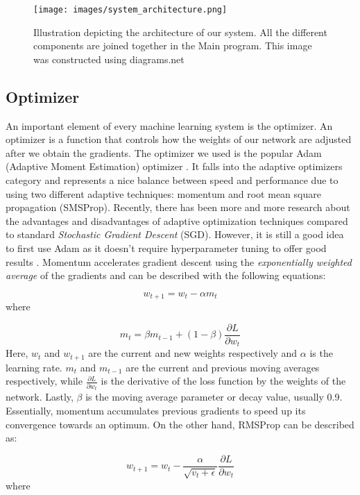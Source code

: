 \documentclass[times, utf8, diplomski, english]{fer_eng}
\begin{document}
\begin{figure}[h]
	\centering
	\texttt{[image: images/system\_architecture.png]}
	\caption[Architecture]{Illustration depicting the architecture of our system. All the different components are joined together in the Main program. This image was constructed using diagrams.net\footnotemark{}}
	\label{fig:architecture}
\end{figure}

\subsection{Optimizer}
\label{subsec:optimizer}

An important element of every machine learning system is the optimizer. An optimizer is a function that controls how the weights of our network are adjusted after we obtain the gradients. The optimizer we used is the popular Adam (Adaptive Moment Estimation) optimizer \cite{adam}. It falls into the adaptive optimizers category and represents a nice balance between speed and performance due to using two different adaptive techniques: momentum and root mean square propagation (SMSProp). Recently, there has been more and more research about the advantages and disadvantages of adaptive optimization techniques compared to standard \textit{Stochastic Gradient Descent} (SGD). However, it is still a good idea to first use Adam as it doesn't require hyperparameter tuning to offer good results \cite{optimizers}. Momentum accelerates gradient descent using the \textit{exponentially weighted average} of the gradients and can be described with the following equations:

\[ w_{t+1} = w_t - \alpha m_t \]
where

\[ m_t = \beta m_{t-1} + (1 - \beta)  \frac{\partial L}{\partial w_t} \]
Here, $w_t$ and $w_{t+1}$ are the current and new weights respectively and $\alpha$ is the learning rate. $m_t$ and $m_{t-1}$ are the current and previous moving averages respectively, while $\frac{\partial L}{\partial w_t}$ is the derivative of the loss function by the weights of the network. Lastly, $\beta$ is the moving average parameter or decay value, usually 0.9. Essentially, momentum accumulates previous gradients to speed up its convergence towards an optimum. On the other hand, RMSProp can be described as:

\[ w_{t+1} = w_t - \frac{\alpha}{\sqrt{v_t + \epsilon}} \frac{\partial L}{\partial w_t} \]
where
\end{document}
